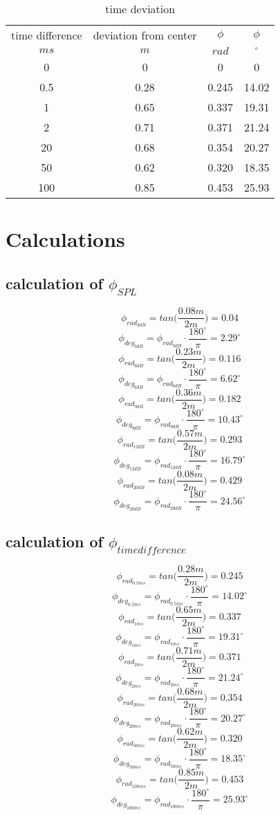 \documentclass{article}
\begin{document}
\begin{table}
\begin{center}
\begin{tabular}{|c||c||c|c|}
\hline
time difference & deviation from center & $\phi$ & $\phi$ \\
$ms$	&	$m$	&	$rad$	&	$^\circ$		\\
\hline
\hline
0 & 0 & 0 & 0\\
\hline
0.5 & 0.28 & 0.245 & 14.02\\
\hline
1 & 0.65 & 0.337 & 19.31\\
\hline
2 & 0.71 & 0.371 & 21.24\\
\hline
20 & 0.68 & 0.354 & 20.27\\
\hline
50 & 0.62 & 0.320 & 18.35\\
\hline
100 & 0.85 & 0.453 & 25.93\\
\hline
\end{tabular}
\caption{time deviation}
\label{tab:time}
\end{center}
\end{table}

\section{Calculations}
\subsection{calculation of $\phi_{SPL}$}
$$\phi_{rad_{3dB}}=tan\bigg(\frac{0.08m}{2m}\bigg)=0.04$$
$$\phi_{deg_{3dB}}=\phi_{rad_{3dB}}\cdot\frac{180^\circ}{\pi}=2.29^\circ$$
$$\phi_{rad_{6dB}}=tan\bigg(\frac{0.23m}{2m}\bigg)=0.116$$
$$\phi_{deg_{6dB}}=\phi_{rad_{6dB}}\cdot\frac{180^\circ}{\pi}=6.62^\circ$$
$$\phi_{rad_{9dB}}=tan\bigg(\frac{0.36m}{2m}\bigg)=0.182$$
$$\phi_{deg_{9dB}}=\phi_{rad_{9dB}}\cdot\frac{180^\circ}{\pi}=10.43^\circ$$
$$\phi_{rad_{12dB}}=tan\bigg(\frac{0.57m}{2m}\bigg)=0.293$$
$$\phi_{deg_{12dB}}=\phi_{rad_{12dB}}\cdot\frac{180^\circ}{\pi}=16.79^\circ$$
$$\phi_{rad_{20dB}}=tan\bigg(\frac{0.08m}{2m}\bigg)=0.429$$
$$\phi_{deg_{20dB}}=\phi_{rad_{20dB}}\cdot\frac{180^\circ}{\pi}=24.56^\circ$$


\subsection{calculation of $\phi_{timedifference}$}
$$\phi_{rad_{0.5ms}}=tan\bigg(\frac{0.28m}{2m}\bigg)=0.245$$
$$\phi_{deg_{0.5ms}}=\phi_{rad_{0.5ms}}\cdot\frac{180^\circ}{\pi}=14.02^\circ$$
$$\phi_{rad_{1ms}}=tan\bigg(\frac{0.65m}{2m}\bigg)=0.337$$
$$\phi_{deg_{1ms}}=\phi_{rad_{1ms}}\cdot\frac{180^\circ}{\pi}=19.31^\circ$$
$$\phi_{rad_{2ms}}=tan\bigg(\frac{0.71m}{2m}\bigg)=0.371$$
$$\phi_{deg_{2ms}}=\phi_{rad_{2ms}}\cdot\frac{180^\circ}{\pi}=21.24^\circ$$
$$\phi_{rad_{20ms}}=tan\bigg(\frac{0.68m}{2m}\bigg)=0.354$$
$$\phi_{deg_{20ms}}=\phi_{rad_{20ms}}\cdot\frac{180^\circ}{\pi}=20.27^\circ$$
$$\phi_{rad_{50ms}}=tan\bigg(\frac{0.62m}{2m}\bigg)=0.320$$
$$\phi_{deg_{50ms}}=\phi_{rad_{50ms}}\cdot\frac{180^\circ}{\pi}=18.35^\circ$$
$$\phi_{rad_{100ms}}=tan\bigg(\frac{0.85m}{2m}\bigg)=0.453$$
$$\phi_{deg_{100ms}}=\phi_{rad_{100ms}}\cdot\frac{180^\circ}{\pi}=25.93^\circ$$
\end{document}
